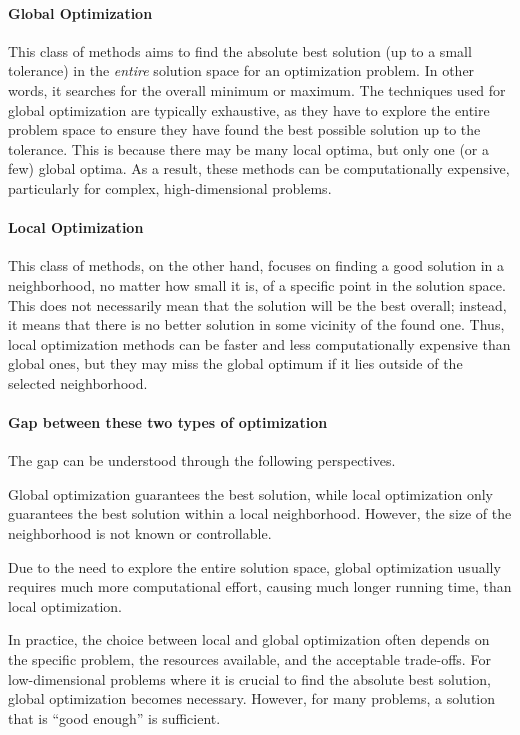 \paragraph{Global Optimization} This class of methods aims to find the absolute best solution (up to a small tolerance) in the \emph{entire} solution space for an optimization problem. In other words, it searches for the overall minimum or maximum. The techniques used for global optimization are typically exhaustive, as they have to explore the entire problem space to ensure they have found the best possible solution up to the tolerance. This is because there may be many local optima, but only one (or a few) global optima. As a result, these methods can be computationally expensive, particularly for complex, high-dimensional problems.

\paragraph{Local Optimization} This class of methods, on the other hand, focuses on finding a good solution in a neighborhood, no matter how small it is, of a specific point in the solution space. This does not necessarily mean that the solution will be the best overall; instead, it means that there is no better solution in some vicinity of the found one. Thus, local optimization methods can be faster and less computationally expensive than global ones, but they may miss the global optimum if it lies outside of the selected neighborhood.

\paragraph{Gap between these two types of optimization} The gap can be understood through the following perspectives.

Global optimization guarantees the best solution, while local optimization only guarantees the best solution within a local neighborhood. However, the size of the neighborhood is not known or controllable.

Due to the need to explore the entire solution space, global optimization usually requires much more computational effort, causing much longer running time, than local optimization.

In practice, the choice between local and global optimization often depends on the specific problem, the resources available, and the acceptable trade-offs. For low-dimensional problems where it is crucial to find the absolute best solution, global optimization becomes necessary. However, for many problems, a solution that is ``good enough'' is sufficient. 

